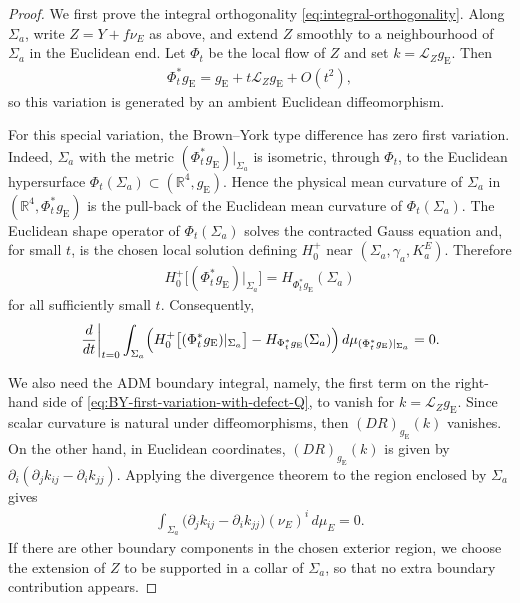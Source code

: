 \documentclass[10pt]{amsart}
\newcommand{\gE}{g_{\mathrm{E}}}
\newcommand{\Lie}{\mathcal{L}}
\theoremstyle{plain}
\theoremstyle{remark}
\begin{document}
	\begin{proof}
		We first prove the integral orthogonality \eqref{eq:integral-orthogonality}. Along $\Sigma_a$, write
		$Z=Y+f\nu_E$ as above, and extend $Z$ smoothly to a neighbourhood of $\Sigma_a$ in the
		Euclidean end. Let $\Phi_t$ be the local flow of $Z$ and set
		$k=\Lie_Z\gE$. Then
		\begin{align*}
			\Phi_t^*\gE=\gE+t\Lie_Z\gE+O(t^2),
		\end{align*}
		so this variation is
		generated by an ambient Euclidean diffeomorphism.
		
		For this special variation, the Brown--York type difference has zero first
		variation. Indeed, $\Sigma_a$ with the metric $(\Phi_t^*\gE)|_{\Sigma_a}$ is
		isometric, through $\Phi_t$, to the Euclidean hypersurface
		$\Phi_t(\Sigma_a)\subset(\mathbb R^4,\gE)$. Hence the physical mean curvature
		of $\Sigma_a$ in $(\mathbb R^4,\Phi_t^*\gE)$ is the pull-back of the Euclidean
		mean curvature of $\Phi_t(\Sigma_a)$. The Euclidean shape operator of
		$\Phi_t(\Sigma_a)$ solves the contracted Gauss equation and, for small $t$, is
		the chosen local solution defining $H_0^+$ near
		$(\Sigma_a,\gamma_a,K_a^E)$. Therefore
		\begin{align}
			H_0^+\bigl[(\Phi_t^*\gE)|_{\Sigma_a}\bigr]
			=
			H_{\Phi_t^*\gE}(\Sigma_a)
		\end{align}
		for all sufficiently small $t$. Consequently,
		\begin{align}\label{eq:BY-defect-proof-zero-first-variation}
			\left.
			\frac{d}{dt}
			\right|_{t=0}
			\int_{\Sigma_a}
			\Bigl(
			H_0^+\bigl[(\Phi_t^*\gE)|_{\Sigma_a}\bigr]
			-
			H_{\Phi_t^*\gE}(\Sigma_a)
			\Bigr)
			\,d\mu_{(\Phi_t^*\gE)|_{\Sigma_a}}
			=
			0.
		\end{align}
		
		We also need the ADM boundary integral, namely, the first term on the right-hand side of \eqref{eq:BY-first-variation-with-defect-Q}, to vanish for
		$k=\Lie_Z\gE$. Since scalar curvature is natural under diffeomorphisms, then $(DR)_{\gE}(k)$ vanishes. On the other
		hand, in Euclidean coordinates,
		$(DR)_{\gE}(k)$ is given by $\partial_i(\partial_jk_{ij}-\partial_i k_{jj})$. Applying the
		divergence theorem to the region enclosed by $\Sigma_a$ gives
		\begin{align}\label{eq:BY-defect-proof-zero-ADM-boundary}
			\int_{\Sigma_a}
			\bigl(
			\partial_j k_{ij}
			-
			\partial_i k_{jj}
			\bigr)(\nu_E)^i\,d\mu_E
			=
			0 .
		\end{align}
		If there are other boundary components in the chosen exterior region, we choose
		the extension of $Z$ to be supported in a collar of $\Sigma_a$, so that no
		extra boundary contribution appears.
		

\end{proof}
\end{document}
